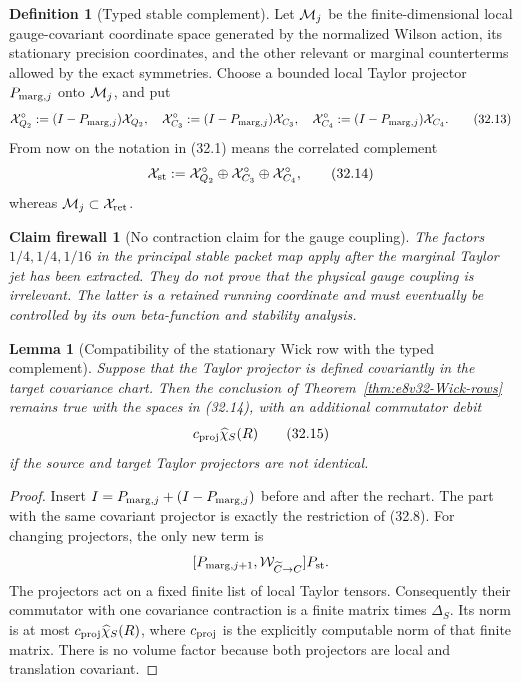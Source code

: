 \documentclass[11pt,oneside]{book}
\newtheorem{lemma}[theorem]{Lemma}
\newtheorem{firewall}[theorem]{Claim firewall}
\theoremstyle{definition}
\newtheorem{definition}[theorem]{Definition}
\theoremstyle{remark}
\begin{document}
\begin{definition}[Typed stable complement]
\label{def:e8v32-typed-complement}
Let \({\cal M}_j\) be the finite-dimensional local gauge-covariant
coordinate space generated by the normalized Wilson action, its
stationary precision coordinates, and the other relevant or marginal
counterterms allowed by the exact symmetries.  Choose a bounded local
Taylor projector \(P_{{\rm marg},j}\) onto \({\cal M}_j\), and put
\[
 {\cal X}_{Q_2}^{\circ}:=(I-P_{{\rm marg},j}){\cal X}_{Q_2},\quad
 {\cal X}_{C_3}^{\circ}:=(I-P_{{\rm marg},j}){\cal X}_{C_3},\quad
 {\cal X}_{C_4}^{\circ}:=(I-P_{{\rm marg},j}){\cal X}_{C_4}.       \tag{32.13}
\]
From now on the notation in (32.1) means the correlated complement
\[
 {\cal X}_{\rm st}:=
 {\cal X}_{Q_2}^{\circ}\oplus
 {\cal X}_{C_3}^{\circ}\oplus
 {\cal X}_{C_4}^{\circ},                                        \tag{32.14}
\]
whereas \({\cal M}_j\subset{\cal X}_{\rm ret}\).
\end{definition}

\begin{firewall}[No contraction claim for the gauge coupling]
\label{fire:e8v32-marginal}
The factors \(1/4,1/4,1/16\) in the principal stable packet map
apply after the marginal Taylor jet has been extracted.  They do not
prove that the physical gauge coupling is irrelevant.  The latter is
a retained running coordinate and must eventually be controlled by
its own beta-function and stability analysis.
\end{firewall}

\begin{lemma}[Compatibility of the stationary Wick row with the
typed complement]
\label{lem:e8v32-complement-Wick}
Suppose that the Taylor projector is defined covariantly in the
target covariance chart.  Then the conclusion of
Theorem~\ref{thm:e8v32-Wick-rows} remains true with the spaces in
(32.14), with an additional commutator debit
\[
 c_{\rm proj}\widehat\chi_S(R)                                  \tag{32.15}
\]
if the source and target Taylor projectors are not identical.
\end{lemma}

\begin{proof}
Insert \(I=P_{{\rm marg},j}+(I-P_{{\rm marg},j})\) before and after
the rechart.  The part with the same covariant projector is exactly
the restriction of (32.8).  For changing projectors, the only new
term is
\[
 [P_{{\rm marg},j+1},{\cal W}_{\widetilde C\to C}]
 P_{\rm st}.
\]
The projectors act on a fixed finite list of local Taylor tensors.
Consequently their commutator with one covariance contraction is a
finite matrix times \(\Delta_S\).  Its norm is at most
\(c_{\rm proj}\widehat\chi_S(R)\), where
\(c_{\rm proj}\) is the explicitly computable norm of that finite
matrix.  There is no volume factor because both projectors are local
and translation covariant.
\end{proof}
\end{document}
